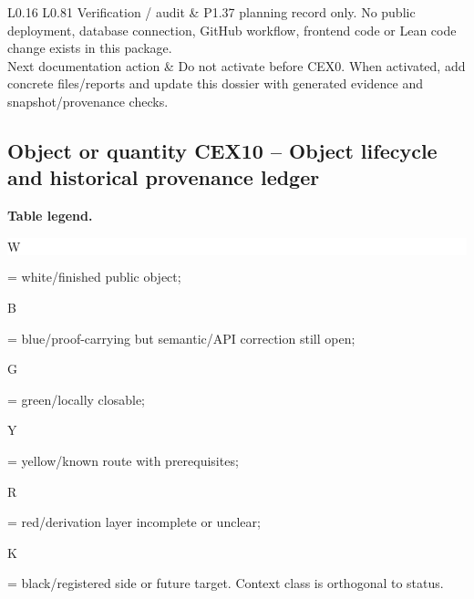 \begin{longtable}{L{0.16\linewidth} L{0.81\linewidth}}
\hline\addlinespace[0.20em]
Verification /\allowbreak{} audit & P1.37 planning record only. No public deployment, database connection, GitHub workflow, frontend code or Lean code change exists in this package.\\
\hline\addlinespace[0.20em]
Next documentation action & Do not activate before CEX0. When activated, add concrete files/\allowbreak{}reports and update this dossier with generated evidence and snapshot/\allowbreak{}provenance checks.\\
\hline\addlinespace[0.20em]
\end{longtable}
\subsection*{Object or quantity CEX10 -- Object lifecycle and historical provenance ledger}
\hypertarget{objproof:CEX10}{}
\par\smallskip\noindent\begin{minipage}{0.99\linewidth}\footnotesize\raggedright\textbf{Table legend.} \colorbox{white}{\strut W} = white/finished public object; \colorbox{cyan!20}{\strut B} = blue/proof-carrying but semantic/API correction still open; \colorbox{green!18}{\strut G} = green/locally closable; \colorbox{yellow!25}{\strut Y} = yellow/known route with prerequisites; \colorbox{red!20}{\strut R} = red/derivation layer incomplete or unclear; \colorbox{black!18}{\strut K} = black/registered side or future target. Context class is orthogonal to status.\end{minipage}\par\vspace{0.25em}
